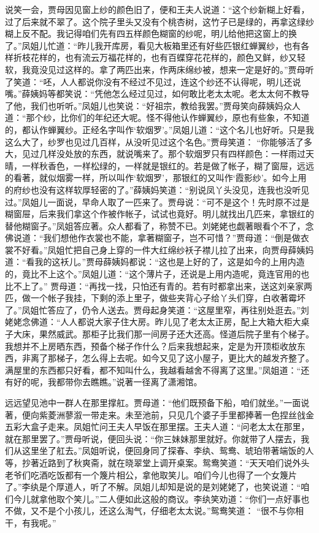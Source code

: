 \begin{parag}
    说笑一会，贾母因见窗上纱的颜色旧了，便和王夫人说道：“这个纱新糊上好看，过了后来就不翠了。这个院子里头又没有个桃杏树，这竹子已是绿的，再拿这绿纱糊上反不配。我记得咱们先有四五样颜色糊窗的纱呢，明儿给他把这窗上的换了。”凤姐儿忙道：“昨儿我开库房，看见大板箱里还有好些匹银红蝉翼纱，也有各样折枝花样的，也有流云万福花样的，也有百蝶穿花花样的，颜色又鲜，纱又轻软，我竟没见过这样的。拿了两匹出来，作两床绵纱被，想来一定是好的。”贾母听了笑道：“呸，人人都说你没有不经过不见过，连这个纱还不认得呢，明儿还说嘴。”薛姨妈等都笑说：“凭他怎么经过见过，如何敢比老太太呢。老太太何不教导了他，我们也听听。”凤姐儿也笑说：“好祖宗，教给我罢。”贾母笑向薛姨妈众人道：“那个纱，比你们的年纪还大呢。怪不得他认作蝉翼纱，原也有些象，不知道的，都认作蝉翼纱。正经名字叫作‘软烟罗’。”凤姐儿道：“这个名儿也好听。只是我这么大了，纱罗也见过几百样，从没听见过这个名色。”贾母笑道： “你能够活了多大，见过几样没处放的东西，就说嘴来了。那个软烟罗只有四样颜色：一样雨过天晴，一样秋香色，一样松绿的，一样就是银红的。若是做了帐子，糊了窗屉，远远的看著，就似烟雾一样，所以叫作‘软烟罗’，那银红的又叫作‘霞影纱’。如今上用的府纱也没有这样软厚轻密的了。”薛姨妈笑道：“别说凤丫头没见，连我也没听见过。”凤姐儿一面说，早命人取了一匹来了。贾母说：“可不是这个！先时原不过是糊窗屉，后来我们拿这个作被作帐子，试试也竟好。明儿就找出几匹来，拿银红的替他糊窗子。”凤姐答应著。众人都看了，称赞不已。刘姥姥也觑著眼看个不了，念佛说道：“我们想他作衣裳也不能，拿著糊窗子，岂不可惜？”贾母道：“倒是做衣裳不好看。”凤姐忙把自己身上穿的一件大红绵纱袄子襟儿拉了出来，向贾母薛姨妈道：“看我的这袄儿。”贾母薛姨妈都说：“这也是上好的了，这是如今的上用内造的，竟比不上这个。”凤姐儿道：“这个薄片子，还说是上用内造呢，竟连官用的也比不上了。” 贾母道：“再找一找，只怕还有青的。若有时都拿出来，送这刘亲家两匹，做一个帐子我挂，下剩的添上里子，做些夹背心子给丫头们穿，白收著霉坏了。”凤姐忙答应了，仍令人送去。贾母起身笑道：“这屋里窄，再往别处逛去。”刘姥姥念佛道：“人人都说大家子住大房。昨儿见了老太太正房，配上大箱大柜大桌子大床，果然威武。那柜子比我们那一间房子还大还高。怪道后院子里有个梯子。我想并不上房晒东西，预备个梯子作什么？后来我想起来，定是为开顶柜收放东西，非离了那梯子，怎么得上去呢。如今又见了这小屋子，更比大的越发齐整了。满屋里的东西都只好看，都不知叫什么，我越看越舍不得离了这里。”凤姐道：“还有好的呢，我都带你去瞧瞧。”说著一径离了潇湘馆。
\end{parag}


\begin{parag}
    远远望见池中一群人在那里撑舡。贾母道：“他们既预备下船，咱们就坐。”一面说著，便向紫菱洲蓼溆一带走来。未至池前，只见几个婆子手里都捧著一色捏丝戗金五彩大盒子走来。凤姐忙问王夫人早饭在那里摆。王夫人道：“问老太太在那里，就在那里罢了。”贾母听说，便回头说：“你三妹妹那里就好。你就带了人摆去，我们从这里坐了舡去。”凤姐听说，便回身同了探春、李纨、鸳鸯、琥珀带著端饭的人等，抄著近路到了秋爽斋，就在晓翠堂上调开桌案。鸳鸯笑道：“天天咱们说外头老爷们吃酒吃饭都有一个篾片相公，拿他取笑儿。咱们今儿也得了一个女篾片了。”李纨是个厚道人，听了不解。凤姐儿却知是说的是刘姥姥了，也笑说道：“咱们今儿就拿他取个笑儿。”二人便如此这般的商议。李纨笑劝道：“你们一点好事也不做，又不是个小孩儿，还这么淘气，仔细老太太说。”鸳鸯笑道： “很不与你相干，有我呢。”
\end{parag}


